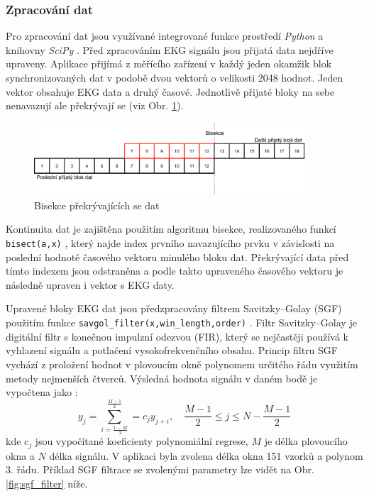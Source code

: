 \subsubsection{Zpracování dat}
\label{section:online_data_process}
Pro zpracování dat jsou využívané integrované funkce prostředí \textit{Python} a
knihovny \textit{SciPy} \cite{SciPy2020}. Před zpracováním EKG signálu jsou
přijatá data nejdříve upraveny. Aplikace přijímá z měřícího zařízení v každý
jeden okamžik blok synchronizovaných dat v podobě dvou vektorů o velikosti 2048
hodnot. Jeden vektor obsahuje EKG data a druhý časové. Jednotlivě přijaté bloky
na sebe nenavazují ale překrývají se (viz Obr. \ref{fig:bisection}). 
\begin{figure}[h]
    \begin{center}
        \includegraphics[width=0.9\textwidth]{../assets/figures/bisection}
        \caption{Bisekce překrývajících se dat}
        \label{fig:bisection}
    \end{center}
\end{figure}
Kontinuita dat je zajištěna použitím algoritmu bisekce, realizovaného funkcí
\texttt{bisect(a,x)} \cite{bisectRight}, který najde index prvního navazujícího
prvku v závislosti na poslední hodnotě časového vektoru minulého bloku dat.
Překrývající data před tímto indexem jsou odstraněna a podle takto upraveného
časového vektoru je následně upraven i vektor s EKG daty. 

Upravené bloky EKG dat jsou předzpracovány filtrem Savitzky–Golay (SGF)
\cite{Schafer2011} použitím funkce
\texttt{savgol{\_}filter(x,win{\_}length,order)} \cite{scipySavgol}. Filtr
Savitzky–Golay je digitální filtr s konečnou impulzní odezvou (FIR), který se
nejčastěji používá k vyhlazení signálu a potlačení vysokofrekvenčního obsahu.
Princip filtru SGF vychází z proložení hodnot v plovoucím okně polynomem
určitého řádu využitím metody nejmenších čtverců. Výsledná hodnota signálu v
daném bodě je vypočtena jako \cite{wikiSGF}:
\begin{equation}
    y_j = \sum_{i=\frac{1-M}{2}}^{\frac{M-1}{2}} = c_j y_{j+i}, \quad \frac{M-1}{2} \leq j \leq N - \frac{M-1}{2}
\end{equation}
kde $c_j$ jsou vypočítané koeficienty polynomiální regrese, $M$ je délka
plovoucího okna a $N$ délka signálu. V aplikaci byla zvolena délka okna 151
vzorků a polynom 3. řádu. Příklad SGF filtrace se zvolenými parametry lze vidět
na Obr. \ref{fig:sgf_filter} níže.

